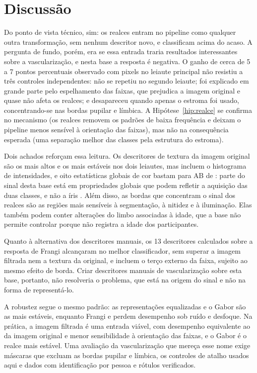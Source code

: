 \chapter{Discussão}
\label{cap:discussao}


Do ponto de vista técnico, sim: os realces entram no pipeline como qualquer
outra transformação, sem nenhum descritor novo, e classificam acima do acaso.
A pergunta de fundo, porém, era se essa entrada traria resultados
interessantes sobre a vascularização, e nesta base a resposta é negativa. O
ganho de cerca de 5 a 7 pontos percentuais observado com pixels no leiaute
principal não resistiu a três controles independentes: não se repetiu no
segundo leiaute; foi explicado em grande parte pelo espelhamento das faixas,
que prejudica a imagem original e quase não afeta os realces; e desapareceu
quando apenas o estroma foi usado, concentrando-se nas bordas pupilar e
límbica. A Hipótese~\ref{hip:realce} se confirma no mecanismo (os realces
removem os padrões de baixa frequência e deixam o pipeline menos sensível à
orientação das faixas), mas não na consequência esperada (uma separação
melhor das classes pela estrutura do estroma).

Dois achados reforçam essa leitura. Os descritores de textura da imagem
original são os mais altos e os mais estáveis nos dois leiautes, mas incluem o
histograma de intensidades, e oito estatísticas globais de cor bastam para AB
de : parte do sinal desta base está em propriedades globais
que podem refletir a aquisição das duas classes, e não a íris
\citep*{Zech2018,Geirhos2020}. Além disso, as bordas que concentram o sinal
dos realces são as regiões mais sensíveis à segmentação, à nitidez e à
iluminação. Elas também podem conter alterações do limbo associadas à idade,
que a base não permite controlar porque não registra a idade dos
participantes.

Quanto à alternativa dos descritores manuais, os 13 descritores calculados
sobre a resposta de Frangi alcançaram  no melhor
classificador, sem superar a imagem filtrada nem a textura da original, e
incluem o terço externo da faixa, sujeito ao mesmo efeito de borda. Criar
descritores manuais de vascularização sobre esta base, portanto, não
resolveria o problema, que está na origem do sinal e não na forma de
representá-lo.

A robustez segue o mesmo padrão: as representações equalizadas e o Gabor são
as mais estáveis, enquanto Frangi e \bh{} perdem desempenho sob ruído e
desfoque. Na prática, a imagem filtrada é uma entrada viável, com desempenho
equivalente ao da imagem original e menor sensibilidade à orientação das
faixas, e o Gabor é o realce mais estável. Uma avaliação da vascularização
que mereça esse nome exige máscaras que excluam as bordas pupilar e límbica,
os controles de atalho usados aqui e dados com identificação por pessoa e
rótulos verificados.


